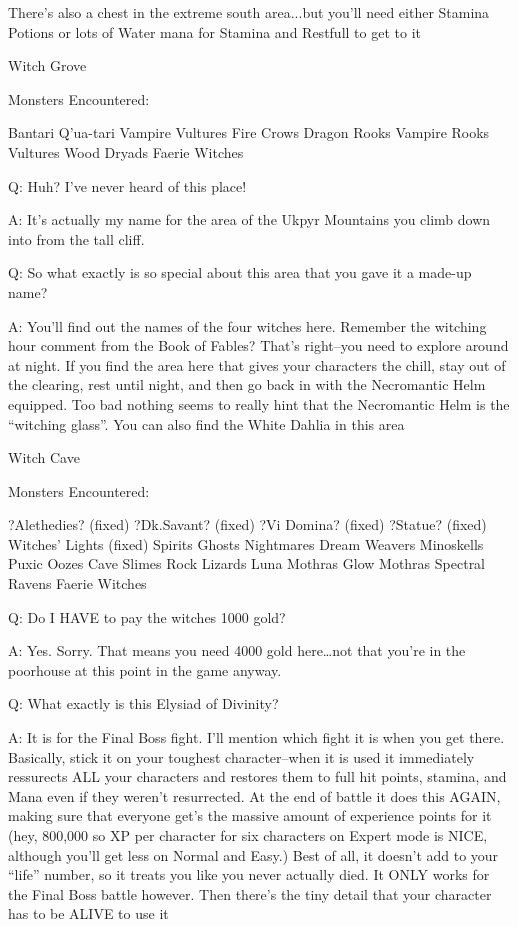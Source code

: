 \documentclass[12pt]{article}
\begin{document}
There's also a chest in the extreme south area...but you'll need either
Stamina Potions or lots of Water mana for Stamina and Restfull to get to it


Witch Grove

Monsters Encountered:

Bantari Q'ua-tari Vampire Vultures Fire Crows Dragon Rooks Vampire Rooks
Vultures Wood Dryads Faerie Witches

Q: Huh? I've never heard of this place!

A: It's actually my name for the area of the Ukpyr Mountains you climb
down into from the tall cliff.

Q: So what exactly is so special about this area that you gave it a
made-up name?

A: You'll find out the names of the four witches here. Remember the
witching hour comment from the Book of Fables? That's right--you need to
explore around at night. If you find the area here that gives your
characters the chill, stay out of the clearing, rest until night, and
then go back in with the Necromantic Helm equipped. Too bad nothing
seems to really hint that the Necromantic Helm is the ``witching
glass''. You can also find the White Dahlia in this area

Witch Cave

Monsters Encountered:

?Alethedies? (fixed) ?Dk.Savant? (fixed) ?Vi Domina? (fixed) ?Statue?
(fixed) Witches' Lights (fixed) Spirits Ghosts Nightmares Dream Weavers
Minoskells Puxic Oozes Cave Slimes Rock Lizards Luna Mothras Glow
Mothras Spectral Ravens Faerie Witches

Q: Do I HAVE to pay the witches 1000 gold?

A: Yes. Sorry. That means you need 4000 gold here\ldots{}not that you're
in the poorhouse at this point in the game anyway.

Q: What exactly is this Elysiad of Divinity?

A: It is for the Final Boss fight. I'll mention which fight it is when
you get there. Basically, stick it on your toughest character--when it
is used it immediately ressurects ALL your characters and restores them
to full hit points, stamina, and Mana even if they weren't resurrected.
At the end of battle it does this AGAIN, making sure that everyone get's
the massive amount of experience points for it (hey, 800,000 so XP per
character for six characters on Expert mode is NICE, although you'll get
less on Normal and Easy.) Best of all, it doesn't add to your ``life''
number, so it treats you like you never actually died. It ONLY works for
the Final Boss battle however. Then there's the tiny detail that your
character has to be ALIVE to use it
\end{document}

